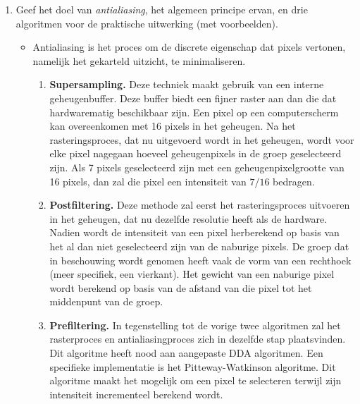 \documentclass{report}
\newcommand{\vraag}[2]{
	\item #1
	
	#2
}
\begin{document}
\begin{enumerate}
		\vraag
		{
			Geef het doel van \textit{antialiasing}, het algemeen principe ervan, en drie algoritmen voor de praktische uitwerking (met voorbeelden). \accentuate{(§1.6)}
		}
		{
			\begin{itemize}
				\item Antialiasing is het proces om de discrete eigenschap dat pixels vertonen, namelijk het gekarteld uitzicht, te minimaliseren. 
				\begin{enumerate}
					\item \textbf{Supersampling.} Deze techniek maakt gebruik van een interne geheugenbuffer. Deze buffer biedt een fijner raster aan dan die dat hardwarematig beschikbaar zijn. Een pixel op een computerscherm kan overeenkomen met 16 pixels in het geheugen. Na het rasteringsproces, dat nu uitgevoerd wordt in het geheugen, wordt voor elke pixel nagegaan hoeveel geheugenpixels in de groep geselecteerd zijn. Als 7 pixels geselecteerd zijn met een geheugenpixelgrootte van 16 pixels, dan zal die pixel een intensiteit van $7/16$ bedragen.
					\item \textbf{Postfiltering.} Deze methode zal eerst het rasteringsproces uitvoeren in het geheugen, dat nu dezelfde resolutie heeft als de hardware. Nadien wordt de intensiteit van een pixel herberekend op basis van het al dan niet geselecteerd zijn van de naburige pixels. De groep dat in beschouwing wordt genomen heeft vaak de vorm van een rechthoek (meer specifiek, een vierkant). Het gewicht van een naburige pixel wordt berekend op basis van de afstand van die pixel tot het middenpunt van de groep.
					\item \textbf{Prefiltering.} In tegenstelling tot de vorige twee algoritmen zal het rasterproces en antialiasingproces zich in dezelfde stap plaatsvinden. Dit algoritme heeft nood aan aangepaste DDA algoritmen. Een specifieke implementatie is het Pitteway-Watkinson algoritme. Dit algoritme maakt het mogelijk om een pixel te selecteren terwijl zijn intensiteit incrementeel berekend wordt. \todo{??}
				\end{enumerate}
			\end{itemize}
		}
	\end{enumerate}
\end{document}
